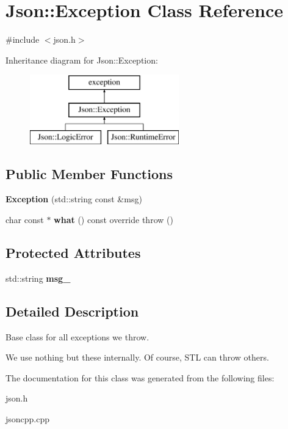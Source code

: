 \hypertarget{class_json_1_1_exception}{\section{Json\-:\-:Exception Class Reference}
\label{class_json_1_1_exception}
}


{\ttfamily \#include $<$json.\-h$>$}

Inheritance diagram for Json\-:\-:Exception\-:\begin{figure}[H]
\begin{center}
\leavevmode
\includegraphics[height=3.000000cm]{class_json_1_1_exception}
\end{center}
\end{figure}
\subsection*{Public Member Functions}
\begin{DoxyCompactItemize}
\item 
\hypertarget{class_json_1_1_exception_a4dd1b9f007bed842e3ef9883d965fe22}{{\bfseries Exception} (std\-::string const \&msg)}\label{class_json_1_1_exception_a4dd1b9f007bed842e3ef9883d965fe22}

\item 
\hypertarget{class_json_1_1_exception_add02e7f2ad4623cb44659ee079859197}{char const $\ast$ {\bfseries what} () const override  throw ()}\label{class_json_1_1_exception_add02e7f2ad4623cb44659ee079859197}

\end{DoxyCompactItemize}
\subsection*{Protected Attributes}
\begin{DoxyCompactItemize}
\item 
\hypertarget{class_json_1_1_exception_a26b7dfcd51256ad4da2742bbd0e14a24}{std\-::string {\bfseries msg\-\_\-}}\label{class_json_1_1_exception_a26b7dfcd51256ad4da2742bbd0e14a24}

\end{DoxyCompactItemize}


\subsection{Detailed Description}
Base class for all exceptions we throw.

We use nothing but these internally. Of course, S\-T\-L can throw others. 

The documentation for this class was generated from the following files\-:\begin{DoxyCompactItemize}
\item 
json.\-h\item 
jsoncpp.\-cpp\end{DoxyCompactItemize}
